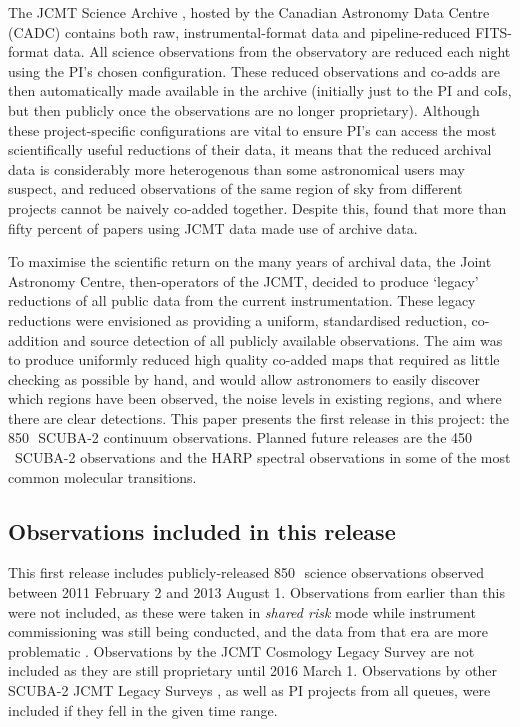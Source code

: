 \documentclass[usenatbib]{mnras}
\newcommand{\um}{\micron}
\begin{document}
The JCMT Science Archive \citep{2015Economou}, hosted by the Canadian
Astronomy Data Centre (CADC) contains both raw, instrumental-format
data and pipeline-reduced FITS-format data. All science observations
from the observatory are reduced each night using the PI's chosen
configuration.  These reduced observations and co-adds are then
automatically made available in the archive (initially just to the PI
and coIs, but then publicly once the observations are no longer
proprietary). Although these project-specific configurations are vital
to ensure PI's can access the most scientifically useful reductions of
their data, it means that the reduced archival data is considerably
more heterogenous than some astronomical users may suspect, and
reduced observations of the same region of sky from different projects
cannot be naively co-added together. Despite this,
\citet{Bell2014} found that more than fifty percent of
papers using JCMT data made use of archive data.

To maximise the scientific return on the many years of archival data,
the Joint Astronomy Centre, then-operators of the JCMT, decided to
produce `legacy' reductions of all public data from the current
instrumentation. These legacy reductions were envisioned as providing
a uniform, standardised reduction, co-addition and source detection of
all publicly available observations. The aim was to produce uniformly
reduced high quality co-added maps that required as little checking as
possible by hand, and would allow astronomers to easily discover which
regions have been observed, the noise levels in existing regions, and
where there are clear detections. This paper presents the first
release in this project: the 850\,\um\ SCUBA-2 continuum
observations. Planned future releases are the 450\,\um\ SCUBA-2
observations and the HARP spectral observations in some of the most
common molecular transitions.



\subsection{Observations included in this release}

This first release includes publicly-released 850\,\um\ science observations
observed between 2011 February 2 and 2013 August 1. Observations from
earlier than this were not included, as these were taken in
\emph{shared risk} mode while instrument commissioning was still being
conducted, and the data from that era are more problematic
\citep{SC19,Dempsey2010}.  Observations by the JCMT Cosmology Legacy
Survey \citep{Geach2013} are not included as they are still
proprietary until 2016 March 1. Observations by other SCUBA-2 JCMT Legacy
Surveys \citep[e.g.,][]{ChrysostomouJLS,GBS,SASSy,SONS,JPS}, as well as PI
projects from all queues, were included if they
fell in the given time range.
\end{document}
